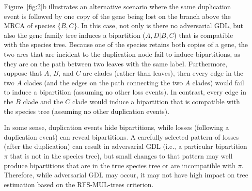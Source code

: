 Figure~\ref{fig:2}b illustrates an alternative scenario where the same duplication event is followed by one copy of the gene being lost on the branch above the MRCA of species $\{B, C\}$. 
In this case, not only is there no adversarial GDL, but also the gene family tree induces a bipartition ($A,D|B,C$) that is compatible with the species tree.
Because one of the species retains both copies of a gene, the two arcs that are incident to the duplication node fail to induce bipartitions, as they are on the path between two leaves with the same label.
Furthermore, suppose that $A$, $B$, and $C$ are clades (rather than leaves), then every edge in the two $A$ clades (and the edges on the path connecting the two $A$ clades) would fail to induce a bipartition (assuming no other loss events).
In contrast, every edge in the $B$ clade and the $C$ clade would induce a bipartition that is compatible with the species tree (assuming no other duplication events).

In some sense, duplication events hide bipartitions, while losses (following a duplication event) can reveal bipartitions.
A carefully selected pattern of losses (after the duplication) can result in adversarial GDL (i.e., a particular bipartition $\pi$ that is not in the species tree), but small changes to that pattern may well produce bipartitions that are in the true species tree or are incompatible with $\pi$.
Therefore, while adversarial GDL may occur, it may not have high impact on tree estimation based on the RFS-MUL-trees criterion.

